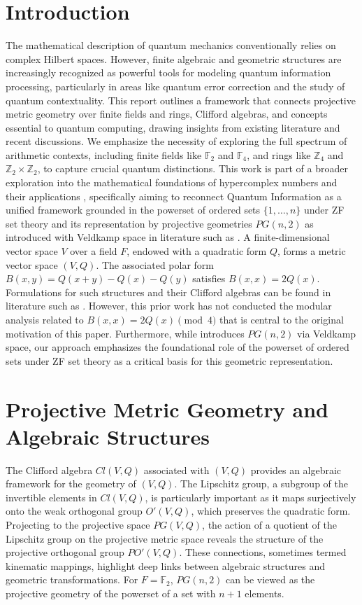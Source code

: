 \documentclass{article}
\begin{document}
\section{Introduction}
The mathematical description of quantum mechanics conventionally relies on complex Hilbert spaces. However, finite algebraic and geometric structures are increasingly recognized as powerful tools for modeling quantum information processing, particularly in areas like quantum error correction and the study of quantum contextuality. This report outlines a framework that connects projective metric geometry over finite fields and rings, Clifford algebras, and concepts essential to quantum computing, drawing insights from existing literature and recent discussions. We emphasize the necessity of exploring the full spectrum of arithmetic contexts, including finite fields like $\mathbb{F}_2$ and $\mathbb{F}_4$, and rings like $\mathbb{Z}_4$ and $\mathbb{Z}_2 \times \mathbb{Z}_2$, to capture crucial quantum distinctions. This work is part of a broader exploration into the mathematical foundations of hypercomplex numbers and their applications \cite{ElKhettabi2024Hypercomplex}, specifically aiming to reconnect Quantum Information as a unified framework grounded in the powerset of ordered sets $\{1, \dots, n\}$ under ZF set theory and its representation by projective geometries $PG(n,2)$ as introduced with Veldkamp space in literature such as \cite{Saniga2014CayleyDickson}. A finite-dimensional vector space $V$ over a field $F$, endowed with a quadratic form $Q$, forms a metric vector space $(V, Q)$. The associated polar form $B(x,y) = Q(x+y) - Q(x) - Q(y)$ satisfies $B(x,x) = 2Q(x)$. Formulations for such structures and their Clifford algebras can be found in literature such as \cite{Havlicek2021Clifford}. However, this prior work has not conducted the modular analysis related to $B(x,x)=2Q(x) \pmod 4$ that is central to the original motivation of this paper. Furthermore, while \cite{Saniga2014CayleyDickson} introduces $PG(n,2)$ via Veldkamp space, our approach emphasizes the foundational role of the powerset of ordered sets under ZF set theory \cite{ElKhettabi2024Hypercomplex} as a critical basis for this geometric representation.

\section{Projective Metric Geometry and Algebraic Structures}
The Clifford algebra $Cl(V,Q)$ associated with $(V,Q)$ provides an algebraic framework for the geometry of $(V,Q)$. The Lipschitz group, a subgroup of the invertible elements in $Cl(V,Q)$, is particularly important as it maps surjectively onto the weak orthogonal group $O'(V,Q)$, which preserves the quadratic form. Projecting to the projective space $PG(V,Q)$, the action of a quotient of the Lipschitz group on the projective metric space reveals the structure of the projective orthogonal group $PO'(V,Q)$. These connections, sometimes termed kinematic mappings, highlight deep links between algebraic structures and geometric transformations. For $F=\mathbb{F}_2$, $PG(n,2)$ can be viewed as the projective geometry of the powerset of a set with $n+1$ elements.
\end{document}
